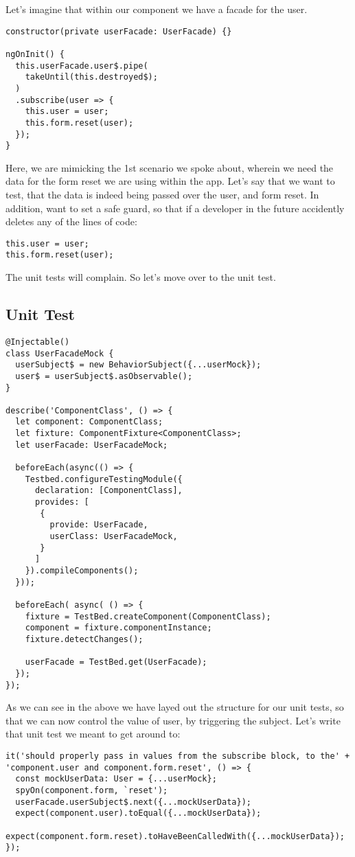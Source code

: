 Let's imagine that within our component we have a facade for the user.
\begin{lstlisting}
constructor(private userFacade: UserFacade) {}

ngOnInit() {
  this.userFacade.user$.pipe(
    takeUntil(this.destroyed$);
  )
  .subscribe(user => {
    this.user = user;
    this.form.reset(user);
  });
}
\end{lstlisting}

Here, we are mimicking the 1st scenario we spoke about, wherein we need the data
for the form reset we are using within the app. Let's say that we want to test,
that the data is indeed being passed over the user, and form reset. In addition,
want to set a safe guard, so that if a developer in the future accidently
deletes any of the lines of code:
\begin{verbatim}
this.user = user;
this.form.reset(user);
\end{verbatim}

The unit tests will complain. So let's move over to the unit test.

\subsection{ Unit Test }

\begin{lstlisting}
@Injectable()
class UserFacadeMock {
  userSubject$ = new BehaviorSubject({...userMock});
  user$ = userSubject$.asObservable();
}

describe('ComponentClass', () => {
  let component: ComponentClass;
  let fixture: ComponentFixture<ComponentClass>;
  let userFacade: UserFacadeMock;

  beforeEach(async(() => {
    Testbed.configureTestingModule({
      declaration: [ComponentClass],
      provides: [
       {
         provide: UserFacade,
         userClass: UserFacadeMock,
       }
      ]
    }).compileComponents();
  }));

  beforeEach( async( () => {
    fixture = TestBed.createComponent(ComponentClass);
    component = fixture.componentInstance;
    fixture.detectChanges();

    userFacade = TestBed.get(UserFacade);
  });
});
\end{lstlisting}

As we can see in the above we have layed out the structure for our unit tests,
so that we can now control the value of user, by triggering the subject. Let's
write that unit test we meant to get around to:
\begin{lstlisting}
it('should properly pass in values from the subscribe block, to the' +
'component.user and component.form.reset', () => {
  const mockUserData: User = {...userMock};
  spyOn(component.form, `reset');
  userFacade.userSubject$.next({...mockUserData});
  expect(component.user).toEqual({...mockUserData});
  expect(component.form.reset).toHaveBeenCalledWith({...mockUserData});
});
\end{lstlisting}

